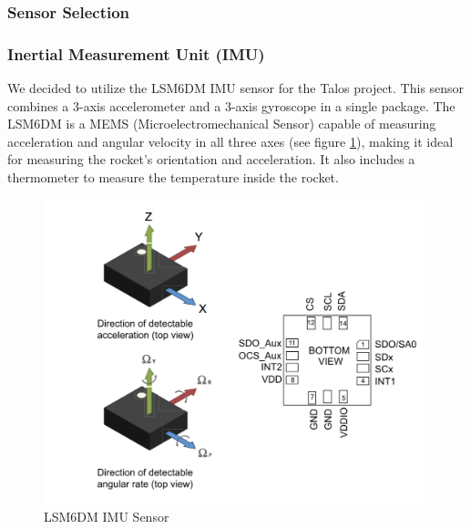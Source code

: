 \documentclass{article}
\begin{document}
\subsubsection{Sensor Selection}
\subsubsection*{Inertial Measurement Unit (IMU)}
We decided to utilize the LSM6DM IMU sensor for the Talos project. This sensor combines a 3-axis accelerometer and a 3-axis gyroscope in a single package. The LSM6DM is a MEMS (Microelectromechanical Sensor) capable of measuring acceleration and angular velocity in all three axes (see figure \ref{fig:lsm6dm}), making it ideal for measuring the rocket's orientation and acceleration. It also includes a thermometer to measure the temperature inside the rocket.
\begin{figure}[p]
      \caption{LSM6DM IMU Sensor\cite{LSM6DSM}}
      \label{fig:lsm6dm}
      \centering
      \includegraphics[width=\textwidth]{ldsm6m.png}
\end{figure}
\end{document}
